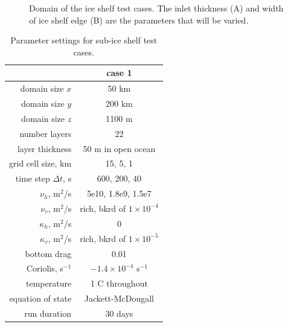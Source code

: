 \documentclass[11pt]{report}
\begin{document}
\begin{figure}[tbh]
\caption{Domain of the ice shelf test cases.  The inlet thickness (A) and width of ice shelf edge (B) are the parameters that will be varied.}
\label{figure:ice shelf domain}
\end{figure}


\begin{table}[tbh] 
\caption{Parameter settings for sub-ice shelf test cases.}
\vspace{0.5cm} \centering 
\begin{tabular}{r|c } 
\hline\hline & case 1 \\
\hline 
domain size $x$ &  50 km\\
domain size $y$ & 200 km\\
domain size $z$ &  1100 m \\
number layers& 22 \\
layer thickness & 50 m in open ocean \\
grid cell size, km  & 15, 5, 1 \\
time step $\Delta t$, s & 600, 200, 40 \\
$\nu_h$, m$^2/$s & 5e10, 1.8e9, 1.5e7 \\
$\nu_v$, m$^2/$s & rich, bkrd of $1\times10^{-4}$ \\
$\kappa_h$, m$^2/$s & 0 \\
$\kappa_v$, m$^2/$s & rich, bkrd of $1\times10^{-5}$ \\
bottom drag & 0.01 \\
Coriolis, s$^{-1}$ & $-1.4\times10^{-4}$ s$^{-1}$ \\
temperature & 1 C throughout \\
equation of state & Jackett-McDougall \\
run duration& 30 days \\
\hline 
\end{tabular} \label{table:ideal test parameters}
\end{table}





\end{document}
